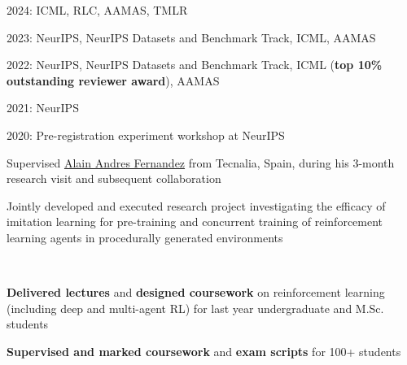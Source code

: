 \documentclass[]{lukas-cv-openfont}
\begin{document}


\noindent
\begin{tightitemize}{1.0em}
    \item 2024: ICML, RLC, AAMAS, TMLR
    \item 2023: NeurIPS, NeurIPS Datasets and Benchmark Track, ICML, AAMAS
    \item 2022: NeurIPS, NeurIPS Datasets and Benchmark Track, ICML (\textbf{top 10\% outstanding reviewer award}), AAMAS
    \item 2021: NeurIPS
    \item 2020: Pre-registration experiment workshop at NeurIPS
\end{tightitemize}
\sectionsep



\begin{tightitemize}{1.7em}
    \item Supervised \href{https://aklein1995.github.io/}{Alain Andres Fernandez} from Tecnalia, Spain, during his 3-month research visit and subsequent collaboration
    \item Jointly developed and executed research project investigating the efficacy of imitation learning for pre-training and concurrent training of reinforcement learning agents in procedurally generated environments \cite{andres2023using}
\end{tightitemize}
\largesectionsep

\noindent
{}
\\
\begin{tightitemize}{1.7em}
    \item \textbf{Delivered lectures} and \textbf{designed coursework} on reinforcement learning (including deep and multi-agent RL) for last year undergraduate and M.Sc. students
    \item \textbf{Supervised and marked coursework} and \textbf{exam scripts} for 100+ students
\end{tightitemize}
\largesectionsep
\end{document}
